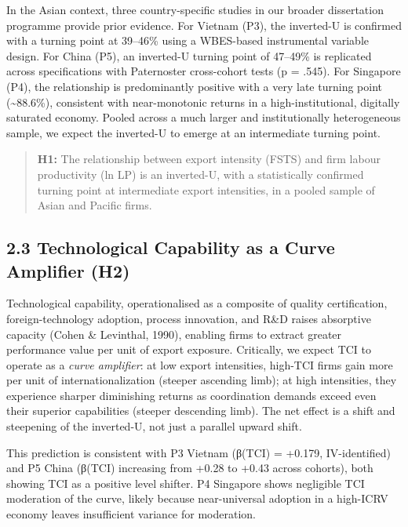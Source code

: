 \documentclass[
  12pt]{article}
\begin{document}
In the Asian context, three country-specific studies in our broader
dissertation programme provide prior evidence. For Vietnam (P3), the
inverted-U is confirmed with a turning point at 39--46\% using a
WBES-based instrumental variable design. For China (P5), an inverted-U
turning point of 47--49\% is replicated across specifications with
Paternoster cross-cohort tests (p = .545). For Singapore (P4), the
relationship is predominantly positive with a very late turning point
(\textasciitilde88.6\%), consistent with near-monotonic returns in a
high-institutional, digitally saturated economy. Pooled across a much
larger and institutionally heterogeneous sample, we expect the
inverted-U to emerge at an intermediate turning point.

\begin{quote}
\textbf{H1:} The relationship between export intensity (FSTS) and firm
labour productivity (ln LP) is an inverted-U, with a statistically
confirmed turning point at intermediate export intensities, in a pooled
sample of Asian and Pacific firms.
\end{quote}

\hypertarget{technological-capability-as-a-curve-amplifier-h2}{%
\subsection{2.3 Technological Capability as a Curve Amplifier
(H2)}\label{technological-capability-as-a-curve-amplifier-h2}}

Technological capability, operationalised as a composite of quality
certification, foreign-technology adoption, process innovation, and R\&D
raises absorptive capacity (Cohen \& Levinthal, 1990), enabling firms to
extract greater performance value per unit of export exposure.
Critically, we expect TCI to operate as a \emph{curve amplifier}: at low
export intensities, high-TCI firms gain more per unit of
internationalization (steeper ascending limb); at high intensities, they
experience sharper diminishing returns as coordination demands exceed
even their superior capabilities (steeper descending limb). The net
effect is a shift and steepening of the inverted-U, not just a parallel
upward shift.

This prediction is consistent with P3 Vietnam (β(TCI) = +0.179,
IV-identified) and P5 China (β(TCI) increasing from +0.28 to +0.43
across cohorts), both showing TCI as a positive level shifter. P4
Singapore shows negligible TCI moderation of the curve, likely because
near-universal adoption in a high-ICRV economy leaves insufficient
variance for moderation.
\end{document}
